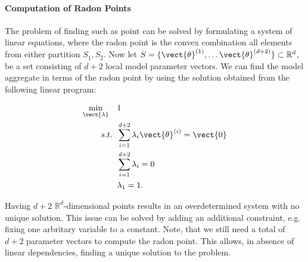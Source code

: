 \paragraph*{Computation of Radon Points}

The problem of finding such as point can be solved by formulating a system of linear equations, where the radon point is the convex combination all elements from either partition $S_1, S_2$.
Now let $S = \{\vect{\theta}^{(1)}, \ldots \vect{\theta}^{(d+2)}\} \subset \mathbb{R}^d$, be a set consisting of $d+2$ local model parameter vectors.
We can find the model aggregate in terms of the radon point by using the solution obtained from the following linear program:

\begin{equation}
    \label{eq:radonopt}
    \begin{split}
        \min_{\vect{\lambda}} \quad &1 \\
        s.t. \;\; &\sum_{i=1}^{d+2} \lambda_i \vect{\theta}^{(i)} = \vect{0}\\
             \;\; &\sum_{i=1}^{d+2} \lambda_i = 0 \\
             \; \; & \lambda_1 = 1.
    \end{split}
\end{equation}

Having $d+2$ $\mathbb{R}^d$-dimensional points results in an overdetermined system with no unique solution.
This issue can be solved by adding an additional constraint, e.g. fixing one arbritary variable to a constant. 
Note, that we still need a total of $d+2$ parameter vectors to compute the radon point.
This allows, in absence of linear dependencies, finding a unique solution to the problem.

